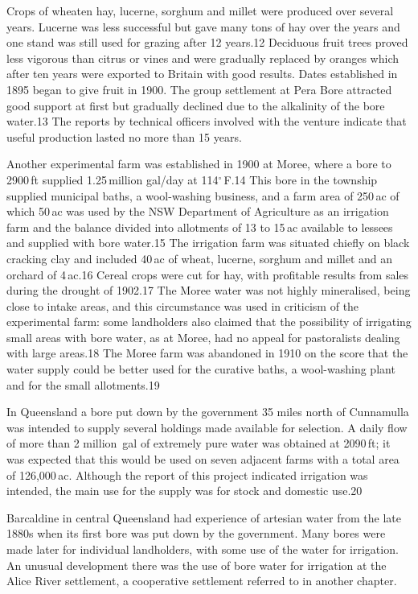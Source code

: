 Crops of wheaten hay, lucerne, sorghum and millet were produced over
several years.  Lucerne was less successful but gave many tons of hay
over the years and one stand was still used for grazing after 12
years.12 Deciduous fruit trees proved less vigorous than citrus or
vines and were gradually replaced by oranges which after ten years
were exported to Britain with good results.  Dates established in 1895
began to give fruit in 1900.  The group settlement at Pera Bore
attracted good support at first but gradually declined due to the
alkalinity of the bore water.13 The reports by technical officers
involved with the venture indicate that useful production lasted no
more than 15 years.

Another experimental farm was established in 1900 at Moree, where a
bore to 2900\,ft supplied 1.25\,million gal/day at 114$^\circ$\,F.14
This bore in the township supplied municipal baths, a wool-washing
business, and a farm area of 250\,ac of which 50\,ac was used by the
NSW Department of Agriculture as an irrigation farm and the balance
divided into allotments of 13 to 15\,ac available to lessees and
supplied with bore water.15 The irrigation farm was situated chiefly
on black cracking clay and included 40\,ac of wheat, lucerne, sorghum
and millet and an orchard of 4\,ac.16 Cereal crops were cut for hay,
with profitable results from sales during the drought of 1902.17 The
Moree water was not highly mineralised, being close to intake areas,
and this circumstance was used in criticism of the experimental farm:
some landholders also claimed that the possibility of irrigating small
areas with bore water, as at Moree, had no appeal for pastoralists
dealing with large areas.18 The Moree farm was abandoned in 1910 on
the score that the water supply could be better used for the curative
baths, a wool-washing plant and for the small allotments.19

In Queensland a bore put down by the government 35 miles north of
Cunnamulla was intended to supply several holdings made available for
selection. A daily flow of more than 2 million~gal of extremely pure
water was obtained at 2090\,ft; it was expected that this would be
used on seven adjacent farms with a total area of 126,000\,ac.
Although the report of this project indicated irrigation was intended,
the main use for the supply was for stock and domestic use.20

Barcaldine in central Queensland had experience of artesian water from
the late 1880s when its first bore was put down by the government.
Many bores were made later for individual landholders, with some use
of the water for irrigation.  An unusual development there was the use
of bore water for irrigation at the Alice River settlement, a
cooperative settlement referred to in another chapter.


